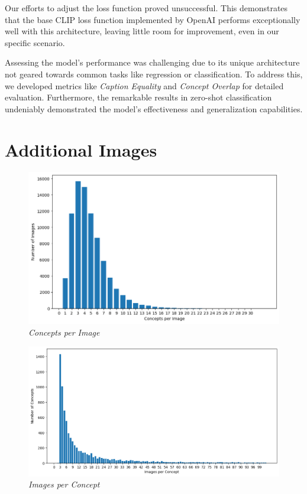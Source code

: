 \documentclass[10pt,twocolumn,letterpaper]{article}
\begin{document}
Our efforts to adjust the loss function proved unsuccessful. This demonstrates that the base CLIP loss function implemented by OpenAI performs exceptionally well with this architecture, leaving little room for improvement, even in our specific scenario.

Assessing the model's performance was challenging due to its unique architecture not geared towards common tasks like regression or classification. To address this, we developed metrics like \textit{Caption Equality} and \textit{Concept Overlap} for detailed evaluation. 
Furthermore, the remarkable results in zero-shot classification undeniably demonstrated the model's effectiveness and generalization capabilities.

\appendix
\section{Additional Images}
\begin{figure}[H]
   \centering
   \includegraphics[width=1\linewidth]{img/Data_Exploration_2.png}
   \caption{\textit{Concepts per Image}}
   \label{fig:cpi}
\end{figure}

\begin{figure}[H]
   \centering
   \includegraphics[width=1\linewidth]{img/Data_Exploration_3.png}
   \caption{\textit{Images per Concept}}
   \label{fig:ipc}
\end{figure}
\end{document}
